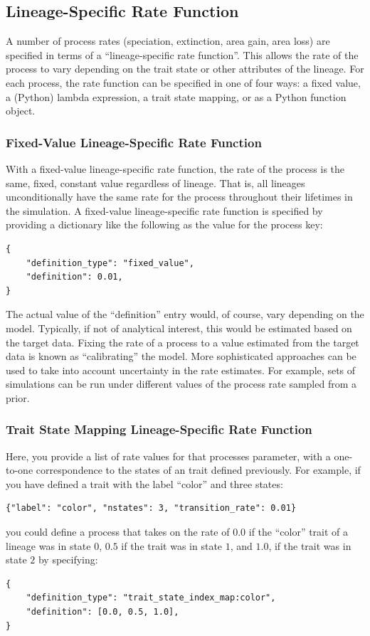 \documentclass[11pt,openany]{memoir} %
\begin{document}
\subsection{Lineage-Specific Rate Function}

A number of process rates (speciation, extinction, area gain, area loss) are specified in terms of a ``lineage-specific rate function''.
This allows the rate of the process to vary depending on the trait state or other attributes of the lineage.
For each process, the rate function can be specified in one of four ways: a fixed value, a (Python) lambda expression, a trait state mapping, or as a Python function object.

\subsubsection{Fixed-Value Lineage-Specific Rate Function}
With a fixed-value lineage-specific rate function, the rate of the process is the same, fixed, constant value regardless of lineage.
That is, all lineages unconditionally have the same rate for the process throughout their lifetimes in the simulation.
A fixed-value lineage-specific rate function is specified by providing a dictionary like the following as the value for the process key:
\begin{lstlisting}
{
    "definition_type": "fixed_value",
    "definition": 0.01,
}
\end{lstlisting}
The actual value of the ``definition'' entry would, of course, vary depending on the model.
Typically, if not of analytical interest, this would be estimated based on the target data.
Fixing the rate of a process to a value estimated from the target data is known as ``calibrating'' the model.
More sophisticated approaches can be used to take into account uncertainty in the rate estimates.
For example, sets of simulations can be run under different values of the process rate sampled from a prior.

\subsubsection{Trait State Mapping Lineage-Specific Rate Function}
Here, you provide a list of rate values for that processes parameter, with a one-to-one correspondence to the states of an trait defined previously.
For example, if you have defined a trait with the label ``color'' and three states:
\begin{lstlisting}
{"label": "color", "nstates": 3, "transition_rate": 0.01}
\end{lstlisting}
you could define a process that takes on the rate of $0.0$ if the ``color'' trait of a lineage was in state $0$, $0.5$ if the trait was in state $1$, and $1.0$, if the trait was in state $2$ by specifying:
\begin{lstlisting}
{
    "definition_type": "trait_state_index_map:color",
    "definition": [0.0, 0.5, 1.0],
}
\end{lstlisting}
\end{document}
